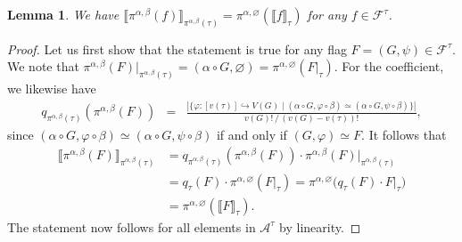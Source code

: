 \documentclass[a4paper,11pt]{article}
\newtheorem{lemma}[theorem]{Lemma}
\numberwithin{equation}{section}
\newcommand{\mA}{\mathcal{A}}
\newcommand{\mF}{\mathcal{F}}
\begin{document}
%
\begin{lemma}\label{lemma:harmonic_downward}
    We have $\llbracket \pi^{\alpha,\beta}(f) \rrbracket_{\pi^{\alpha,\beta}(\tau)} = \pi^{\alpha,\varnothing}(\llbracket f \rrbracket_{\tau})$ for any $f \in\mF^\tau$.
\end{lemma}
%
\begin{proof}
    Let us first show that the statement is true for any flag $F = (G,\psi) \in \mF^\tau$. We note that $\pi^{\alpha,\beta}(F)\vert_{\pi^{\alpha,\beta}(\tau)} = (\alpha\circ G,\varnothing) = \pi^{\alpha,\varnothing}(F\vert_\tau)$. For the coefficient, we likewise have
    \begin{eqnarray*}
        q_{\pi^{\alpha,\beta}(\tau)}(\pi^{\alpha,\beta}(F))
        &=&
        \frac{|\{\varphi : [v(\tau)] \hookrightarrow V(G) \mid (\alpha\circ G, \varphi\circ \beta) \simeq (\alpha\circ G,\psi\circ \beta) \}|}{v(G)! \, / \, (v(G)-v(\tau))!},
    \end{eqnarray*}
    since $(\alpha\circ G,\varphi\circ \beta) \simeq (\alpha\circ G,\psi\circ \beta)$ if and only if $(G,\varphi) \simeq F$.
    It follows that 
    \begin{align*}
        \llbracket \pi^{\alpha,\beta}(F) \rrbracket_{\pi^{\alpha,\beta}(\tau)} & = q_{\pi^{\alpha,\beta}(\tau)}(\pi^{\alpha,\beta}(F)) \cdot \pi^{\alpha,\beta}(F)\vert_{\pi^{\alpha,\beta}(\tau)} \\
        & = q_\tau(F) \cdot \pi^{\alpha,\varnothing}( F \vert_\tau )
        = \pi^{\alpha, \varnothing}\big( q_\tau(F) \cdot F \vert_\tau \big) \\
        & = \pi^{\alpha,\varnothing}(\llbracket F \rrbracket_{\tau}).
    \end{align*}
    The statement now follows for all elements in $\mA^\tau$ by linearity. 
\end{proof}
\end{document}
